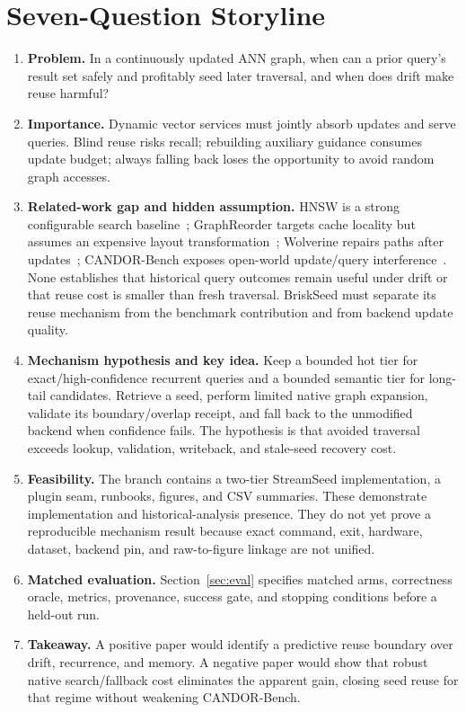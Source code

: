 \documentclass[10pt]{article}
\begin{document}
\section{Seven-Question Storyline}
\begin{enumerate}[leftmargin=*,label=\textbf{Q\arabic*.}]
\item \textbf{Problem.} In a continuously updated ANN graph, when can a prior query's result set safely and profitably seed later traversal, and when does drift make reuse harmful?
\item \textbf{Importance.} Dynamic vector services must jointly absorb updates and serve queries.  Blind reuse risks recall; rebuilding auxiliary guidance consumes update budget; always falling back loses the opportunity to avoid random graph accesses.
\item \textbf{Related-work gap and hidden assumption.} HNSW is a strong configurable search baseline~\cite{malkov2020hnsw}; GraphReorder targets cache locality but assumes an expensive layout transformation~\cite{coleman2022graphreorder}; Wolverine repairs paths after updates~\cite{liu2025wolverine}; CANDOR-Bench exposes open-world update/query interference~\cite{wang2026candor}.  None establishes that historical query outcomes remain useful under drift or that reuse cost is smaller than fresh traversal.  BriskSeed must separate its reuse mechanism from the benchmark contribution and from backend update quality.
\item \textbf{Mechanism hypothesis and key idea.} Keep a bounded hot tier for exact/high-confidence recurrent queries and a bounded semantic tier for long-tail candidates.  Retrieve a seed, perform limited native graph expansion, validate its boundary/overlap receipt, and fall back to the unmodified backend when confidence fails.  The hypothesis is that avoided traversal exceeds lookup, validation, writeback, and stale-seed recovery cost.
\item \textbf{Feasibility.} The branch contains a two-tier StreamSeed implementation, a plugin seam, runbooks, figures, and CSV summaries.  These demonstrate implementation and historical-analysis presence.  They do not yet prove a reproducible mechanism result because exact command, exit, hardware, dataset, backend pin, and raw-to-figure linkage are not unified.
\item \textbf{Matched evaluation.} Section~\ref{sec:eval} specifies matched arms, correctness oracle, metrics, provenance, success gate, and stopping conditions before a held-out run.
\item \textbf{Takeaway.} A positive paper would identify a predictive reuse boundary over drift, recurrence, and memory.  A negative paper would show that robust native search/fallback cost eliminates the apparent gain, closing seed reuse for that regime without weakening CANDOR-Bench.
\end{enumerate}
\end{document}
